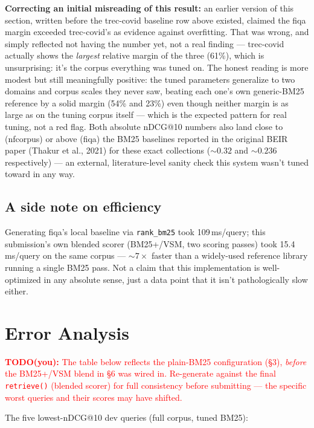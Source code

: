 \documentclass[11pt]{article}
\newcommand{\todo}[1]{\textcolor{red}{\textbf{TODO(you):} #1}}
\begin{document}
\noindent \textbf{Correcting an initial misreading of this result:} an
earlier version of this section, written before the trec-covid baseline
row above existed, claimed the fiqa margin exceeded trec-covid's as
evidence against overfitting. That was wrong, and simply reflected
not having the number yet, not a real finding --- trec-covid actually
shows the \emph{largest} relative margin of the three (61\%), which is
unsurprising: it's the corpus everything was tuned on. The honest
reading is more modest but still meaningfully positive: the tuned
parameters generalize to two domains and corpus scales they never saw,
beating each one's own generic-BM25 reference by a solid margin (54\%
and 23\%) even though neither margin is as large as on the tuning
corpus itself --- which is the expected pattern for real tuning, not a
red flag. Both absolute nDCG@10 numbers also land close to (nfcorpus) or
above (fiqa) the BM25 baselines reported in the original BEIR paper
(Thakur et al., 2021) for these exact collections (${\sim}0.32$ and
${\sim}0.236$ respectively) --- an external, literature-level sanity
check this system wasn't tuned toward in any way.

\subsection{A side note on efficiency}
Generating fiqa's local baseline via \texttt{rank\_bm25} took
109\,ms/query; this submission's own blended scorer (BM25+/VSM, two
scoring passes) took 15.4\,ms/query on the same corpus --- ${\sim}7\times$
faster than a widely-used reference library running a single BM25 pass.
Not a claim that this implementation is well-optimized in any absolute
sense, just a data point that it isn't pathologically slow either.

\section{Error Analysis}

\todo{The table below reflects the plain-BM25 configuration (\S 3),
\emph{before} the BM25+/VSM blend in \S 6 was wired in. Re-generate
against the final \texttt{retrieve()} (blended scorer) for full
consistency before submitting --- the specific worst queries and their
scores may have shifted.}

The five lowest-nDCG@10 dev queries (full corpus, tuned BM25):
\end{document}
